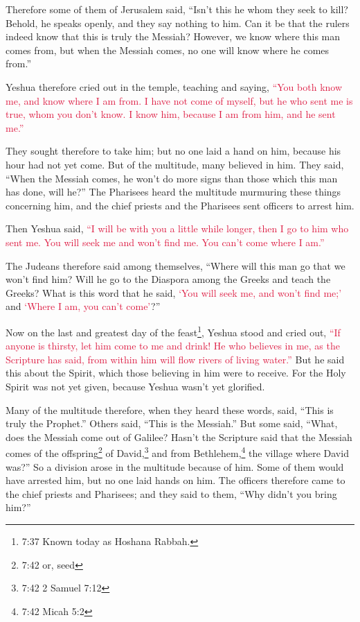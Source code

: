 \myverse{}Therefore some of them of Jerusalem said, “Isn’t this he whom
they seek to kill?
\myverse{}Behold, he speaks openly, and they say nothing to him. Can it be that the
rulers indeed know that this is truly the Messiah?
\myverse{}However, we know where this man comes from, but when the Messiah comes, no
one will know where he comes from.”

\myverse{}Yeshua therefore cried out in the temple, teaching and saying,
\textcolor{crimson}{“You both know me, and know where I am from. I have not come of myself, but he who sent me is true,
	whom you don’t know.
}
\myverse{}\textcolor{crimson}{I know him, because I am from him, and he sent me.”}

\myverse{}They sought therefore to take him; but no one laid a hand on
him, because his hour had not yet come.
\myverse{}But of the multitude, many believed in him. They said, “When the Messiah comes,
he won’t do more signs than those which this man has done, will he?”
\myverse{}The Pharisees heard the multitude murmuring these things concerning him, and
the chief priests and the Pharisees sent officers to arrest him.

\myverse{}Then Yeshua said,
\textcolor{crimson}{“I will be with you a little while longer, then I go to him who sent me.
}
\myverse{}\textcolor{crimson}{You will seek me and won’t find me. You can’t come where I am.”}

\myverse{}The Judeans therefore said among themselves, “Where will this
man go that we won’t find him? Will he go to the Diaspora among the Greeks and teach the Greeks?
\myverse{}What is this word that he said,
\textcolor{crimson}{‘You will seek me, and won’t find me;’} and
\textcolor{crimson}{‘Where I am, you can’t come’}?”

\myverse{}Now on the last and greatest day of the feast\footnote{7:37 Known today as Hoshana Rabbah.},
Yeshua stood and cried out,
\textcolor{crimson}{“If anyone is thirsty, let him come to me and drink!
}
\myverse{}\textcolor{crimson}{He who believes in me, as the Scripture has said, from within him will
	flow rivers of living water.”}
\myverse{}But he said this about the Spirit, which those believing in him were to receive.
For the Holy Spirit was not yet given, because Yeshua wasn’t yet glorified.

\myverse{}Many of the multitude therefore, when they heard these words,
said, “This is truly the Prophet.”
\myverse{}Others said, “This is the Messiah.” But some said, “What, does the Messiah
come out of Galilee?
\myverse{}Hasn’t the Scripture said that the Messiah comes of the offspring\footnote{7:42 or, seed} of David,\footnote{7:42 2 Samuel 7:12} and from Bethlehem,\footnote{7:42 Micah 5:2} the village where David was?”
\myverse{}So a division arose in the multitude because of him.
\myverse{}Some of them would have arrested him, but no one laid hands on him.
\myverse{}The officers therefore came to the chief priests and Pharisees; and they said
to them, “Why didn’t you bring him?”

